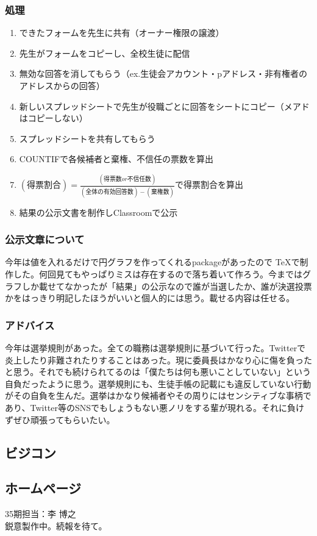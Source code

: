 \documentclass[dvipdfmx,jb5]{jarticle}
\begin{document}
\subsubsection{処理}
\begin{enumerate}
\item できたフォームを先生に共有（オーナー権限の譲渡）
\item 先生がフォームをコピーし、全校生徒に配信
\item 無効な回答を消してもらう（ex.生徒会アカウント・pアドレス・非有権者のアドレスからの回答）
\item 新しいスプレッドシートで先生が役職ごとに回答をシートにコピー（メアドはコピーしない）
\item スプレッドシートを共有してもらう
\item COUNTIFで各候補者と棄権、不信任の票数を算出
\item $(得票割合)=\frac{(得票数or不信任数)}{(全体の有効回答数) - (棄権数)}$で得票割合を算出
\item 結果の公示文書を制作しClassroomで公示
\end{enumerate}
\subsubsection{公示文章について}
今年は値を入れるだけで円グラフを作ってくれるpackageがあったので \TeX で制作した。何回見てもやっぱりミスは存在するので落ち着いて作ろう。今まではグラフしか載せてなかったが「結果」の公示なので誰が当選したか、誰が決選投票かをはっきり明記したほうがいいと個人的には思う。載せる内容は任せる。
\subsubsection{アドバイス}
今年は選挙規則があった。全ての職務は選挙規則に基づいて行った。Twitterで炎上したり非難されたりすることはあった。現に委員長はかなり心に傷を負ったと思う。それでも続けられてるのは「僕たちは何も悪いことしていない」という自負だったように思う。選挙規則にも、生徒手帳の記載にも違反していない行動がその自負を生んだ。選挙はかなり候補者やその周りにはセンシティブな事柄であり、Twitter等のSNSでもしょうもない悪ノリをする輩が現れる。それに負けずぜひ頑張ってもらいたい。
\subsection{ビジコン}
\subsection{ホームページ}
35期担当：李 博之\\
鋭意製作中。続報を待て。
\end{document}
